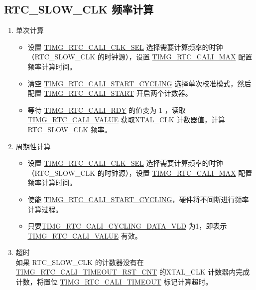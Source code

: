 \documentclass[main\_\_CN.tex]{subfiles}
\begin{document}
\subsection{RTC\_SLOW\_CLK 频率计算}
\begin{enumerate}
    \item 单次计算
    \begin{itemize}
        \item 设置 \hyperref[fielddesc:TIMGRTCCALICLKSEL]{TIMG\_RTC\_CALI\_CLK\_SEL} 选择需要计算频率的时钟（RTC\_SLOW\_CLK 的时钟源），设置 \hyperref[fielddesc:TIMGRTCCALIMAX]{TIMG\_RTC\_CALI\_MAX} 配置频率计算时间。
        \item 清空 \hyperref[fielddesc:TIMGRTCCALISTARTCYCLING]{TIMG\_RTC\_CALI\_START\_CYCLING} 选择单次校准模式，然后配置 \hyperref[fielddesc:TIMGRTCCALISTART]{TIMG\_RTC\_CALI\_START} 开启两个计数器。
        \item 等待 \hyperref[fielddesc:TIMGRTCCALIRDY]{TIMG\_RTC\_CALI\_RDY} 的值变为 1 ，读取\hyperref[fielddesc:TIMGRTCCALIVALUE]{TIMG\_RTC\_CALI\_VALUE} 获取XTAL\_CLK 计数器值，计算 RTC\_SLOW\_CLK 频率。
    \end{itemize}
    \item 周期性计算
    \begin{itemize}
        \item 设置 \hyperref[fielddesc:TIMGRTCCALICLKSEL]{TIMG\_RTC\_CALI\_CLK\_SEL} 选择需要计算频率的时钟（RTC\_SLOW\_CLK 的时钟源），设置 \hyperref[fielddesc:TIMGRTCCALIMAX]{TIMG\_RTC\_CALI\_MAX} 配置频率计算时间。
        \item 使能 \hyperref[fielddesc:TIMGRTCCALISTARTCYCLING]{TIMG\_RTC\_CALI\_START\_CYCLING}，硬件将不间断进行频率计算过程。
        \item 只要\hyperref[fielddesc:TIMGRTCCALICYCLINGDATAVLD]{TIMG\_RTC\_CALI\_CYCLING\_DATA\_VLD} 为1，即表示\hyperref[fielddesc:TIMGRTCCALIVALUE]{TIMG\_RTC\_CALI\_VALUE} 有效。
    \end{itemize}
    \item 超时\\
    如果 RTC\_SLOW\_CLK 的计数器没有在\hyperref[fielddesc:TIMGRTCCALITIMEOUTRSTCNT]{TIMG\_RTC\_CALI\_TIMEOUT\_RST\_CNT} 的XTAL\_CLK 计数器内完成计数，将置位 \hyperref[fielddesc:TIMGRTCCALITIMEOUT]{TIMG\_RTC\_CALI\_TIMEOUT} 标记计算超时。 
\end{enumerate}

\end{document}
